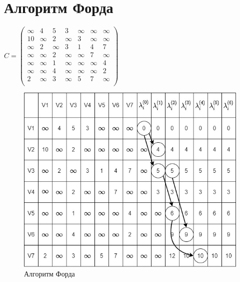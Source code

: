\section{Алгоритм Форда}
$C = \begin{pmatrix}
\infty & 4 & 5 & 3 & \infty & \infty &
\infty\\
10 & \infty & 2 & \infty & 3 & \infty &
\infty\\
\infty & 2 & \infty & 3 & 1 & 4 & 7\\
\infty & \infty & 2 & \infty & \infty & 7
& \infty\\
\infty & \infty & 1 & \infty & \infty &
\infty & 4\\
\infty & \infty & 4 & \infty & \infty &
\infty & 2\\
2 & \infty & 3 & \infty & 5 & 7 & \infty\\
\end{pmatrix}$
\begin{figure}[!htb]
	\centering
	\includegraphics[width=\textwidth]{Images/graph3.jpg}
	\caption{Алгоритм Форда}
	\label{fig:image3}
\end{figure}
\newpage

